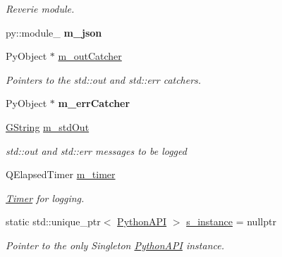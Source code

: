 \begin{DoxyCompactItemize}
\begin{DoxyCompactList}\small\item\em Reverie module. \end{DoxyCompactList}\item 
\mbox{\label{classrev_1_1_python_a_p_i_ae5cd9b1b6c1252aedea6cd98fa4da9d3}} 
py\+::module\+\_\+ {\bfseries m\+\_\+json}
\item 
\mbox{\label{classrev_1_1_python_a_p_i_a8d01ce6a5beb621b7789c66d8bc35ad9}} 
Py\+Object $\ast$ \mbox{\hyperlink{classrev_1_1_python_a_p_i_a8d01ce6a5beb621b7789c66d8bc35ad9}{m\+\_\+out\+Catcher}}
\begin{DoxyCompactList}\small\item\em Pointers to the std\+::out and std\+::err catchers. \end{DoxyCompactList}\item 
\mbox{\label{classrev_1_1_python_a_p_i_a720d27e79ef093ed5baf33ad958ba19e}} 
Py\+Object $\ast$ {\bfseries m\+\_\+err\+Catcher}
\item 
\mbox{\label{classrev_1_1_python_a_p_i_ab055292f48c720e655d00f6235d2184c}} 
\mbox{\hyperlink{classrev_1_1_g_string}{G\+String}} \mbox{\hyperlink{classrev_1_1_python_a_p_i_ab055292f48c720e655d00f6235d2184c}{m\+\_\+std\+Out}}
\begin{DoxyCompactList}\small\item\em std\+::out and std\+::err messages to be logged \end{DoxyCompactList}\item 
\mbox{\label{classrev_1_1_python_a_p_i_ac9bd68e21b62435e6bd8c216ecb1e2ae}} 
Q\+Elapsed\+Timer \mbox{\hyperlink{classrev_1_1_python_a_p_i_ac9bd68e21b62435e6bd8c216ecb1e2ae}{m\+\_\+timer}}
\begin{DoxyCompactList}\small\item\em \mbox{\hyperlink{classrev_1_1_timer}{Timer}} for logging. \end{DoxyCompactList}\item 
\mbox{\label{classrev_1_1_python_a_p_i_aa30594b61c3500a13cf21ff0a30c32d5}} 
static std\+::unique\+\_\+ptr$<$ \mbox{\hyperlink{classrev_1_1_python_a_p_i}{Python\+A\+PI}} $>$ \mbox{\hyperlink{classrev_1_1_python_a_p_i_aa30594b61c3500a13cf21ff0a30c32d5}{s\+\_\+instance}} = nullptr
\begin{DoxyCompactList}\small\item\em Pointer to the only Singleton \mbox{\hyperlink{classrev_1_1_python_a_p_i}{Python\+A\+PI}} instance. \end{DoxyCompactList}\end{DoxyCompactItemize}


